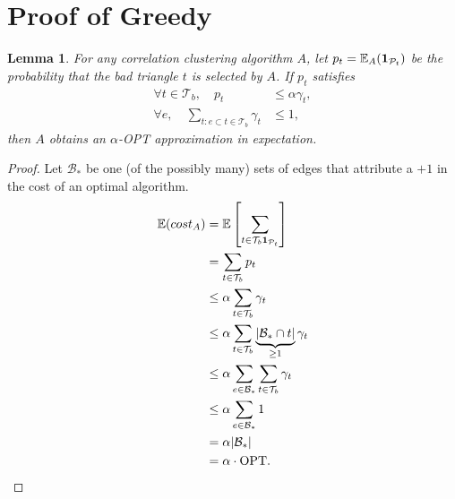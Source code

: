 \documentclass{article} %
\newtheorem{lem}{Lemma}
\begin{document}
\section{Proof of Greedy}

\begin{lem}
\label{lem:alphaapprox}
For any correlation clustering algorithm $A$, let $p_t = \mathbb{E}_A({\bf 1}_{\mathcal{P}_t})$ be the probability that the bad triangle $t$ is selected by $A$.
If $p_t$ satisfies
\begin{align*}
\forall t \in \mathcal{T}_b, \quad p_t &\leq \alpha\gamma_t,\\
\forall e,                            \quad \sum_{t: e \subset t \in \mathcal{T}_b} \gamma_t &\leq 1,
\end{align*}
then $A$ obtains an $\alpha$-OPT approximation in expectation.
\end{lem}
\begin{proof}
Let $\mathcal{B}_*$ be one (of the possibly many) sets of edges that attribute a $+1$ in the cost of an optimal algorithm.
\begin{align*}
\mathbb{E}(cost_A)
&=    \mathbb{E}\left[\sum_{t\in\mathcal{T}_b {\bf 1}_{\mathcal{P}_t}}\right]\\
&=    \sum_{t \in \mathcal{T}_b} p_t\\
&\leq \alpha\sum_{t \in \mathcal{T}_b} \gamma_t\\
&\leq \alpha\sum_{t\in \mathcal{T}_b} \underbrace{|\mathcal{B}_*\cap t|}_{\ge1} \gamma_t\\
&\leq \alpha\sum_{e \in \mathcal{B}_*} \sum_{t\in \mathcal{T}_b} \gamma_t \\
&\leq \alpha\sum_{e \in \mathcal{B}_*} 1 \\
&=    \alpha|\mathcal{B}_*|\\
&=    \alpha \cdot \text{OPT}.
\end{align*}
\end{proof}
\end{document}

